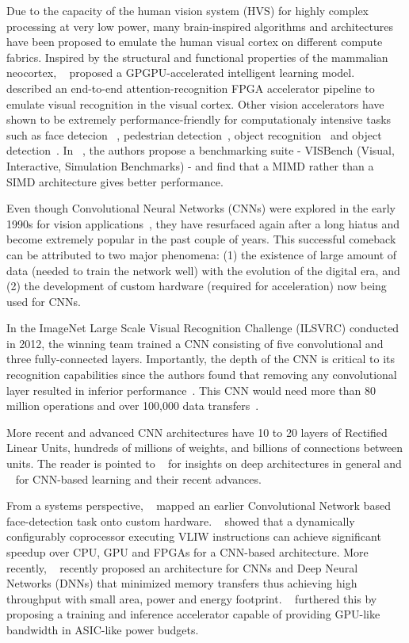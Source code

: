 Due to the capacity of the human vision system (HVS) for highly complex processing at very low power, 
many brain-inspired algorithms and architectures have been proposed to emulate the human visual cortex on different compute fabrics.
Inspired by the structural and functional properties of the mammalian neocortex, ~\cite{Nere2011} proposed a GPGPU-accelerated intelligent learning model.
~\cite{Kestur2011} described an end-to-end attention-recognition FPGA accelerator pipeline to emulate visual recognition in the visual cortex. 
Other vision accelerators have shown to be extremely performance-friendly for computationaly intensive tasks such as 
face detecion ~\cite{violafccm}, pedestrian detection~\cite{sips2014}, object recognition~\cite{Maashri2012a} and object detection~\cite{Bae2011}. In ~\cite{micro2008}, the authors propose a benchmarking suite - VISBench (Visual, Interactive, Simulation Benchmarks) - and find that a MIMD rather than a SIMD architecture gives better performance.

Even though Convolutional Neural Networks (CNNs) were explored in the early 1990s for vision applications~\cite{giles1997}, they have resurfaced again after a long hiatus and become extremely popular in the past couple of years. 
This successful comeback can be attributed to two major phenomena:
(1) the existence of large amount of data (needed to train the network well) with the evolution of the digital era, and (2) the development of 
custom hardware (required for acceleration) now being used for CNNs. 

In the ImageNet Large Scale Visual Recognition Challenge (ILSVRC)
conducted in 2012, the winning team trained a CNN consisting of five convolutional and three fully-connected layers. Importantly, the depth of the CNN is critical to 
its recognition capabilities since the authors found that removing any convolutional layer resulted in inferior performance~\cite{NIPS2012}. This CNN would need
more than 80 million operations and over 100,000 data transfers~\cite{XilinxCNN}.

More recent and advanced CNN architectures have 10 to 20 layers of Rectified Linear Units, hundreds of millions of weights, and billions of connections between units.
The reader is pointed to ~\cite{Bengio2009} for insights on deep architectures in general and ~\cite{DNNNature2015} for CNN-based learning and their recent advances. 

From a systems perspective, ~\cite{Farabet2009} mapped an earlier Convolutional Network based face-detection task onto custom hardware. 
~\cite{ISCA2010} showed that a dynamically configurably coprocessor executing VLIW instructions can achieve significant speedup over CPU, GPU and FPGAs for 
a CNN-based architecture. 
More recently, ~\cite{Chen2014} recently proposed an architecture for CNNs and Deep 
Neural Networks (DNNs) that minimized memory transfers thus achieving high
throughput with small area, power and energy footprint. ~\cite{DaDianNao} furthered this by proposing a training and inference accelerator 
capable of providing GPU-like bandwidth in ASIC-like power budgets.
